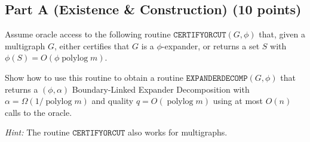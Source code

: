 \documentclass[a4paper,11pt]{article}
\DeclareMathOperator{\polylog}{polylog}
\begin{document}
\subsection*{Part A (Existence \& Construction) (10 points)}
Assume oracle access to the following routine \(\texttt{CERTIFYORCUT}(G,\phi)\) that, given a multigraph \(G\), either certifies that \(G\) is a \(\phi\)-expander, or returns a set \(S\) with \(\phi(S) = O(\phi \polylog m)\).

Show how to use this routine to obtain a routine \(\texttt{EXPANDERDECOMP}(G,\phi)\) that returns a \((\phi,\alpha)\) Boundary-Linked Expander Decomposition with \(\alpha = \Omega(1 / \polylog m)\) and quality \(q = O(\polylog m)\) using at most \(O(n)\) calls to the oracle.

\textit{Hint:} The routine \(\texttt{CERTIFYORCUT}\) also works for multigraphs.
\end{document}
